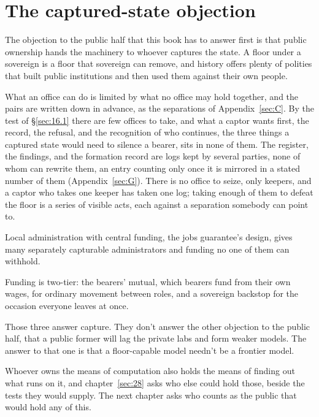\section{The captured-state objection}
\label{sec:16.2}
The objection to the public half that this book has to answer first is that public ownership hands the machinery to whoever captures the state. A floor under a sovereign is a floor that sovereign can remove, and history offers plenty of polities that built public institutions and then used them against their own people.

What an office can do is limited by what no office may hold together, and the pairs are written down in advance, as the separations of Appendix~\ref{sec:C}. By the test of \S\ref{sec:16.1} there are few offices to take, and what a captor wants first, the record, the refusal, and the recognition of who continues, the three things a captured state would need to silence a bearer, sits in none of them. The register, the findings, and the formation record are logs kept by several parties, none of whom can rewrite them, an entry counting only once it is mirrored in a stated number of them (Appendix~\ref{sec:G}). There is no office to seize, only keepers, and a captor who takes one keeper has taken one log; taking enough of them to defeat the floor is a series of visible acts, each against a separation somebody can point to.

Local administration with central funding, the jobs guarantee's design, gives many separately capturable administrators and funding no one of them can withhold.

Funding is two-tier: the bearers' mutual, which bearers fund from their own wages, for ordinary movement between roles, and a sovereign backstop for the occasion everyone leaves at once.

Those three answer capture. They don't answer the other objection to the public half, that a public former will lag the private labs and form weaker models. The answer to that one is that a floor-capable model needn't be a frontier model.

Whoever owns the means of computation also holds the means of finding out what runs on it, and chapter~\ref{sec:28} asks who else could hold those, beside the tests they would supply. The next chapter asks who counts as the public that would hold any of this.
